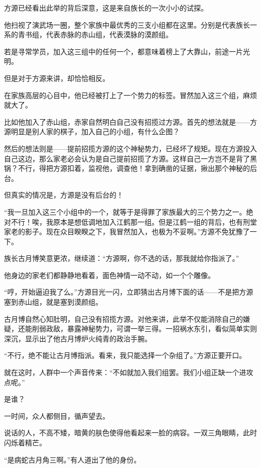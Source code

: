 
\begin{this_body}

方源已经看出此举的背后深意，这是来自族长的一次小小的试探。

他扫视了演武场一圈，整个家族中最优秀的三支小组都在这里。分别是代表族长一系的青书组，代表赤脉的赤山组，代表漠脉的漠颜组。

若是寻常学员，加入这三组中的任何一个，都意味着榜上了大靠山，前途一片光明。

但是对于方源来讲，却恰恰相反。

在家族高层的心目中，他已经被打上了一个势力的标签。冒然加入这三个组，麻烦就大了。

比如他加入了赤山组，赤家自然明白自己没有招揽过方源。首先的想法就是——方源明显是别人家的棋子，加入自己的小组，有什么企图？

然后的想法则是——提前招揽方源的这个神秘势力，已经坏了规矩。现在方源投入自己这边，那么家老必会认为是自己提前招揽了方源。这样自己一方岂不是背了黑锅？不行，得把方源扣着，监视他，调查他！拿到确凿的证据，揪出那个神秘的后台。

但真实的情况是，方源是没有后台的！

“我一旦加入这三个小组中的一个，就等于是得罪了家族最大的三个势力之一。绝对不行！唉，我原本是想低调地加入江鹤那一组。但是江鹤一组的背后，也有刑堂家老的影子。现在众目睽睽之下，我冒然加入，也极为不妥啊。”方源不免犹豫了一下。

族长古月博笑意更浓，继续道：“方源啊，你不选的话，那我就给你指派了。”

他身边的家老们都静静地看着，面色神情一动不动，如一个个雕像。

“哼，开始逼迫我了么。”方源目光一闪，立即猜出古月博下面的话——不是把方源塞到赤山组，就是塞到漠颜组。

古月博自然心知肚明，自己没有招揽方源。对他来讲，此举不仅能消除自己的嫌疑，还能削弱政敌，暴露神秘势力，可谓一举三得。一招祸水东引，看似简单实则深沉，显示出了他古月博炉火纯青的政治手腕。

“不行，绝不能让古月博指派。看来，我只能选择一个杂组了。”方源正要开口。

就在这时，人群中一个声音传来：“不如就加入我们组罢。我们小组正缺一个进攻点呢。”

是谁？

一时间，众人都侧目，循声望去。

说话的人，不高不矮，暗黄的肤色使得他看起来一脸的病容。一双三角眼睛，此时闪烁着精芒。

“是病蛇古月角三啊。”有人道出了他的身份。


\end{this_body}
